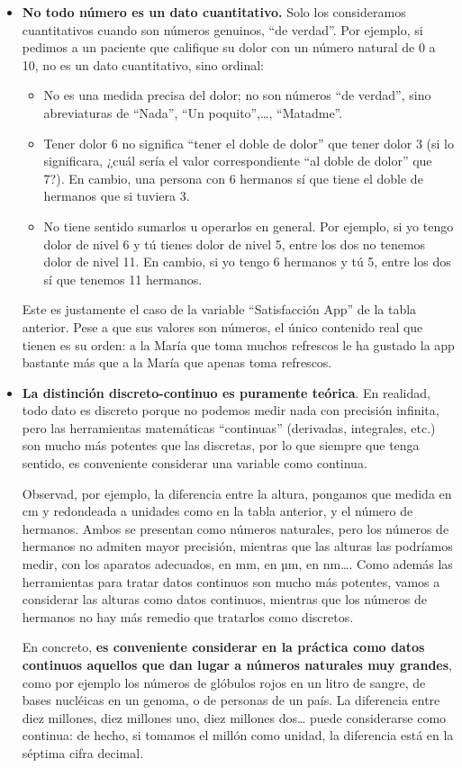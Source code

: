 \documentclass[
  letterpaper,
  DIV=11,
  numbers=noendperiod]{scrreprt}
\begin{document}
\begin{itemize}
\item
  \textbf{No todo número es un dato cuantitativo.} Solo los consideramos
  cuantitativos cuando son números genuinos, ``de verdad''. Por ejemplo,
  si pedimos a un paciente que califique su dolor con un número natural
  de 0 a 10, no es un dato cuantitativo, sino ordinal:

  \begin{itemize}
  \item
    No es una medida precisa del dolor; no son números ``de verdad'',
    sino abreviaturas de ``Nada'', ``Un poquito'',\ldots, ``Matadme''.
  \item
    Tener dolor 6 no significa ``tener el doble de dolor'' que tener
    dolor 3 (si lo significara, ¿cuál sería el valor correspondiente
    ``al doble de dolor'' que 7?). En cambio, una persona con 6 hermanos
    sí que tiene el doble de hermanos que si tuviera 3.
  \item
    No tiene sentido sumarlos u operarlos en general. Por ejemplo, si yo
    tengo dolor de nivel 6 y tú tienes dolor de nivel 5, entre los dos
    no tenemos dolor de nivel 11. En cambio, si yo tengo 6 hermanos y tú
    5, entre los dos sí que tenemos 11 hermanos.
  \end{itemize}

  Este es justamente el caso de la variable ``Satisfacción App'' de la
  tabla anterior. Pese a que sus valores son números, el único contenido
  real que tienen es su orden: a la María que toma muchos refrescos le
  ha gustado la app bastante más que a la María que apenas toma
  refrescos.
\item
  \textbf{La distinción discreto-continuo es puramente teórica}. En
  realidad, todo dato es discreto porque no podemos medir nada con
  precisión infinita, pero las herramientas matemáticas ``continuas''
  (derivadas, integrales, etc.) son mucho más potentes que las
  discretas, por lo que siempre que tenga sentido, es conveniente
  considerar una variable como continua.

  Observad, por ejemplo, la diferencia entre la altura, pongamos que
  medida en cm y redondeada a unidades como en la tabla anterior, y el
  número de hermanos. Ambos se presentan como números naturales, pero
  los números de hermanos no admiten mayor precisión, mientras que las
  alturas las podríamos medir, con los aparatos adecuados, en mm, en µm,
  en nm\ldots. Como además las herramientas para tratar datos continuos
  son mucho más potentes, vamos a considerar las alturas como datos
  continuos, mientras que los números de hermanos no hay más remedio que
  tratarlos como discretos.

  En concreto, \textbf{es conveniente considerar en la práctica como
  datos continuos aquellos que dan lugar a números naturales muy
  grandes}, como por ejemplo los números de glóbulos rojos en un litro
  de sangre, de bases nucléicas en un genoma, o de personas de un país.
  La diferencia entre diez millones, diez millones uno, diez millones
  dos\ldots{} puede considerarse como continua: de hecho, si tomamos el
  millón como unidad, la diferencia está en la séptima cifra decimal.
\end{itemize}
\end{document}
